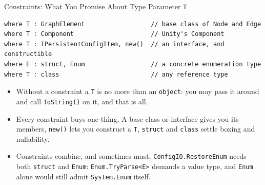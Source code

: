 \begin{frame}[fragile]{Constraints: What You Promise About Type Parameter \texttt{T}}
  \begin{lstlisting}[basicstyle=\scriptsize\ttfamily]
where T : GraphElement                  // base class of Node and Edge
where T : Component                     // Unity's Component
where T : IPersistentConfigItem, new()  // an interface, and constructible
where E : struct, Enum                  // a concrete enumeration type
where T : class                         // any reference type
  \end{lstlisting}
  \vspace{1ex}

  \begin{itemize}
    \item Without a constraint a \texttt{T} is no more than an
      \texttt{object}: you may pass it around and call
      \texttt{ToString()} on it, and that is all.
    \item Every constraint buys one thing. A base class or interface gives you
      its members, \texttt{new()} lets you construct a \texttt{T},
      \texttt{struct} and \texttt{class} settle boxing and nullability.
    \item Constraints combine, and sometimes must. \texttt{ConfigIO.RestoreEnum}
      needs both \texttt{struct} and \texttt{Enum}: \texttt{Enum.TryParse<E>}
      demands a value type, and \texttt{Enum} alone would still admit
      \texttt{System.Enum} itself.
  \end{itemize}
\end{frame}

